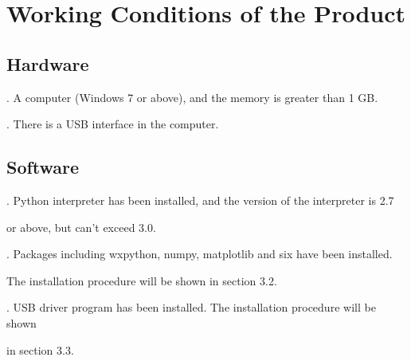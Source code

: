 \chapter{\heiti Working Conditions of the Product}
\section{\heiti Hardware}

. A computer (Windows 7 or above), and the memory is greater than 1 GB.

. There is a USB interface in the computer.

\section{\heiti Software}

. Python interpreter has been installed, and the version of the interpreter is  2.7

\hspace{-0.15cm}or above, but can't exceed 3.0.



. Packages including wxpython, numpy, matplotlib and six have been installed.

\hspace{-0.15cm}The installation procedure will be shown in section 3.2.


. USB driver program has been installed. The installation procedure will be shown 

\hspace{-0.15cm}in section 3.3.
